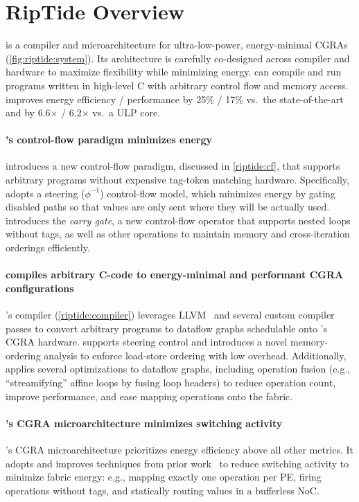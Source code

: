 \section{RipTide Overview}
\label{riptide:overview}

\figRipTideSystem

\riptide is a compiler and microarchitecture for ultra-low-power, energy-minimal CGRAs
(\autoref{fig:riptide:system}).
%
Its architecture is carefully co-designed across compiler and hardware
to maximize flexibility while minimizing energy.
% 
\riptide can compile and run programs written in high-level C with arbitrary control flow and memory access.
% 
\riptide improves energy efficiency / performance
by 25\% / 17\% vs.\ the
state-of-the-art~\cite{snafu} and by 6.6$\times$ / 6.2$\times$
vs.\ a ULP core.

\paragraph{\riptide's control-flow paradigm minimizes energy}
\riptide introduces a new control-flow paradigm, discussed in \autoref{riptide:cf}, that supports arbitrary programs without expensive tag-token matching hardware.
% 
Specifically, \riptide adopts a steering ($\phi^{-1}$) control-flow model, which minimizes energy by gating disabled paths so that values are only sent where they will be actually used.
% 
\riptide introduces the \emph{carry gate}, a new control-flow operator that supports nested loops without tags,
as well as other operations to maintain memory and cross-iteration orderings efficiently.
% 

\paragraph{\riptidecomp compiles arbitrary C-code to energy-minimal and performant CGRA configurations}
%
\riptide's compiler (\autoref{riptide:compiler}) leverages LLVM~\cite{llvm} and several
custom compiler passes to convert arbitrary programs to dataflow
graphs schedulable onto \riptide's CGRA hardware.
%
\riptidecomp supports steering control and introduces a novel
memory-ordering analysis to enforce load-store ordering with low
overhead.
% 
Additionally, \riptidecomp applies several optimizations to dataflow
graphs, including operation fusion (e.g., ``streamifying'' affine loops by fusing loop headers)
to reduce operation count, improve performance, and ease mapping operations onto the fabric.

\paragraph{\riptide's CGRA microarchitecture minimizes switching activity}
%
\riptide's CGRA microarchitecture prioritizes energy efficiency above all other metrics.
%
It adopts and improves techniques from prior work~\cite{snafu} to
reduce switching activity to minimize fabric energy:
%
e.g., mapping exactly one operation per PE,
firing operations without tags,
and statically routing values in a bufferless NoC.

